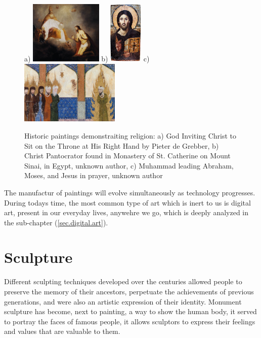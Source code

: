 \documentclass{report}
\begin{document}
\begin{figure}[h]
\center
a) \includegraphics[height=3cm]{img/god}
b) \includegraphics[height=3cm]{img/jesus}
c) \includegraphics[height=3cm]{img/islampainting}
\caption{Historic paintings demonstraiting religion: a) God Inviting Christ to Sit on the Throne at His Right Hand by Pieter de Grebber,
b) Christ Pantocrator found in Monastery of St. Catherine on Mount Sinai, in Egypt, unknown author, c) Muhammad leading Abraham, Moses, and Jesus in prayer, unknown author}
\label{fig:religious-art}
\end{figure}

The manufactur of paintings will evolve simultaneously as technology progresses. During todays time, the most common type of art which is inert to us is digital art, present in our everyday lives, anywehre we go, which is deeply analyzed in the sub-chapter (\ref{sec.digital.art}).

\section{Sculpture}

Different sculpting techniques developed over the centuries allowed people to preserve the memory of their ancestors, perpetuate the achievements of previous generations, and were also an artistic expression of their identity. Monument sculpture has become, next to painting, a way to show the human body, it served to portray the faces of famous people, it allows sculptors to express their feelings and values that are valuable to them.
\end{document}
